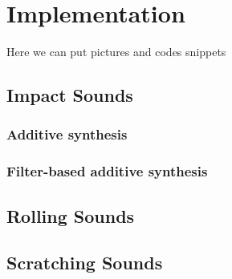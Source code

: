 \chapter{Implementation}\label{ch:implementation}
\mbox{}\par
Here we can put pictures and codes snippets


\section{Impact Sounds}
\mbox{}\par

\subsection{Additive synthesis}

\subsection{Filter-based additive synthesis}

\section{Rolling Sounds}
\section{Scratching Sounds}